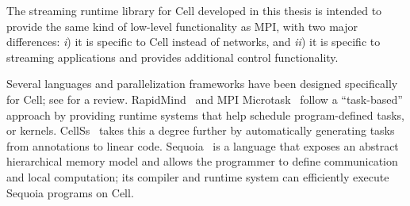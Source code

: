 The streaming runtime library for Cell developed in this thesis is intended to provide the same kind of low-level functionality as MPI, with two major differences: \emph{i}) it is specific to Cell instead of networks, and \emph{ii}) it is specific to streaming applications and provides additional control functionality.

Several languages and parallelization frameworks have been designed specifically for Cell; see \cite{cell:pf} for a review. RapidMind~\cite{rapidmind} and MPI Microtask~\cite{mpimicrotask} follow a ``task-based'' approach by providing runtime systems that help schedule program-defined tasks, or kernels. CellSs~\cite{cellss} takes this a degree further by automatically generating tasks from annotations to linear code. Sequoia~\cite{sequoia} is a language that exposes an abstract hierarchical memory model and allows the programmer to define communication and local computation; its compiler and runtime system can efficiently execute Sequoia programs on Cell.
